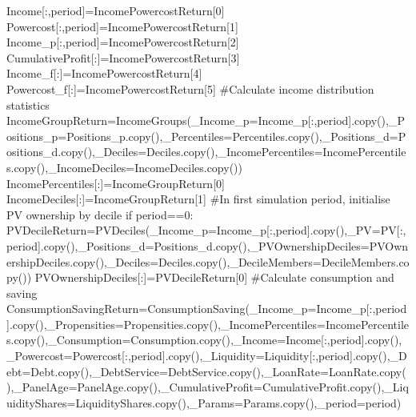 \documentclass[
  letterpaper,
  DIV=11,
  numbers=noendperiod]{scrartcl}
\newenvironment{Shaded}{\begin{snugshade}}{\end{snugshade}}
\newcommand{\CommentTok}[1]{\textcolor[rgb]{0.37,0.37,0.37}{#1}}
\newcommand{\ControlFlowTok}[1]{\textcolor[rgb]{0.00,0.23,0.31}{#1}}
\newcommand{\DecValTok}[1]{\textcolor[rgb]{0.68,0.00,0.00}{#1}}
\newcommand{\NormalTok}[1]{\textcolor[rgb]{0.00,0.23,0.31}{#1}}
\newcommand{\OperatorTok}[1]{\textcolor[rgb]{0.37,0.37,0.37}{#1}}
\begin{document}
\begin{Shaded}
\begin{Highlighting}[]
\NormalTok{        Income[:,period]}\OperatorTok{=}\NormalTok{IncomePowercostReturn[}\DecValTok{0}\NormalTok{]}
\NormalTok{        Powercost[:,period]}\OperatorTok{=}\NormalTok{IncomePowercostReturn[}\DecValTok{1}\NormalTok{]}
\NormalTok{        Income\_p[:,period]}\OperatorTok{=}\NormalTok{IncomePowercostReturn[}\DecValTok{2}\NormalTok{]}
\NormalTok{        CumulativeProfit[:]}\OperatorTok{=}\NormalTok{IncomePowercostReturn[}\DecValTok{3}\NormalTok{]}
\NormalTok{        Income\_f[:]}\OperatorTok{=}\NormalTok{IncomePowercostReturn[}\DecValTok{4}\NormalTok{]}
\NormalTok{        Powercost\_f[:]}\OperatorTok{=}\NormalTok{IncomePowercostReturn[}\DecValTok{5}\NormalTok{]}
        \CommentTok{\#Calculate income distribution statistics}
\NormalTok{        IncomeGroupReturn}\OperatorTok{=}\NormalTok{IncomeGroups(\_Income\_p}\OperatorTok{=}\NormalTok{Income\_p[:,period].copy(),\_Positions\_p}\OperatorTok{=}\NormalTok{Positions\_p.copy(),\_Percentiles}\OperatorTok{=}\NormalTok{Percentiles.copy(),\_Positions\_d}\OperatorTok{=}\NormalTok{Positions\_d.copy(),\_Deciles}\OperatorTok{=}\NormalTok{Deciles.copy(),\_IncomePercentiles}\OperatorTok{=}\NormalTok{IncomePercentiles.copy(),\_IncomeDeciles}\OperatorTok{=}\NormalTok{IncomeDeciles.copy())}
\NormalTok{        IncomePercentiles[:]}\OperatorTok{=}\NormalTok{IncomeGroupReturn[}\DecValTok{0}\NormalTok{]}
\NormalTok{        IncomeDeciles[:]}\OperatorTok{=}\NormalTok{IncomeGroupReturn[}\DecValTok{1}\NormalTok{]}
        \CommentTok{\#In first simulation period, initialise PV ownership by decile}
        \ControlFlowTok{if}\NormalTok{ period}\OperatorTok{==}\DecValTok{0}\NormalTok{:}
\NormalTok{            PVDecileReturn}\OperatorTok{=}\NormalTok{PVDeciles(\_Income\_p}\OperatorTok{=}\NormalTok{Income\_p[:,period].copy(),\_PV}\OperatorTok{=}\NormalTok{PV[:,period].copy(),\_Positions\_d}\OperatorTok{=}\NormalTok{Positions\_d.copy(),\_PVOwnershipDeciles}\OperatorTok{=}\NormalTok{PVOwnershipDeciles.copy(),\_Deciles}\OperatorTok{=}\NormalTok{Deciles.copy(),\_DecileMembers}\OperatorTok{=}\NormalTok{DecileMembers.copy())}
\NormalTok{            PVOwnershipDeciles[:]}\OperatorTok{=}\NormalTok{PVDecileReturn[}\DecValTok{0}\NormalTok{]}
        \CommentTok{\#Calculate consumption and saving}
\NormalTok{        ConsumptionSavingReturn}\OperatorTok{=}\NormalTok{ConsumptionSaving(\_Income\_p}\OperatorTok{=}\NormalTok{Income\_p[:,period].copy(),\_Propensities}\OperatorTok{=}\NormalTok{Propensities.copy(),\_IncomePercentiles}\OperatorTok{=}\NormalTok{IncomePercentiles.copy(),\_Consumption}\OperatorTok{=}\NormalTok{Consumption.copy(),\_Income}\OperatorTok{=}\NormalTok{Income[:,period].copy(),\_Powercost}\OperatorTok{=}\NormalTok{Powercost[:,period].copy(),\_Liquidity}\OperatorTok{=}\NormalTok{Liquidity[:,period].copy(),\_Debt}\OperatorTok{=}\NormalTok{Debt.copy(),\_DebtService}\OperatorTok{=}\NormalTok{DebtService.copy(),\_LoanRate}\OperatorTok{=}\NormalTok{LoanRate.copy(),\_PanelAge}\OperatorTok{=}\NormalTok{PanelAge.copy(),\_CumulativeProfit}\OperatorTok{=}\NormalTok{CumulativeProfit.copy(),\_LiquidityShares}\OperatorTok{=}\NormalTok{LiquidityShares.copy(),\_Params}\OperatorTok{=}\NormalTok{Params.copy(),\_period}\OperatorTok{=}\NormalTok{period)}

\end{Highlighting}
\end{Shaded}
\end{document}
